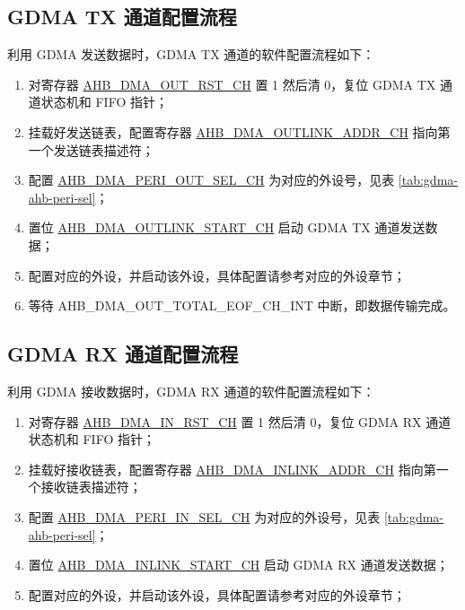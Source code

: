 \documentclass[main\_\_CN.tex]{subfiles}
\begin{document}
\subsection{GDMA TX 通道配置流程}
利用 GDMA 发送数据时，GDMA TX 通道的软件配置流程如下：
\begin{enumerate}
    \item 对寄存器 \hyperref[fielddesc:AHBDMAOUTRSTCHN]{AHB\_DMA\_OUT\_RST\_CH} 置 1 然后清 0，复位 GDMA TX 通道状态机和 FIFO 指针；
    \item 挂载好发送链表，配置寄存器 \hyperref[fielddesc:AHBDMAOUTLINKADDRCHN]{AHB\_DMA\_OUTLINK\_ADDR\_CH} 指向第一个发送链表描述符；
    \item 配置 \hyperref[fielddesc:AHBDMAPERIOUTSELCHN]{AHB\_DMA\_PERI\_OUT\_SEL\_CH} 为对应的外设号，见表 \ref{tab:gdma-ahb-peri-sel}；
    \item 置位 \hyperref[fielddesc:AHBDMAOUTLINKSTARTCHN]{AHB\_DMA\_OUTLINK\_START\_CH} 启动 GDMA TX 通道发送数据；
    \item 配置对应的外设，并启动该外设，具体配置请参考对应的外设章节；
    \item 等待 AHB\_DMA\_OUT\_TOTAL\_EOF\_CH\_INT 中断，即数据传输完成。
\end{enumerate}

\subsection{GDMA RX 通道配置流程}
利用 GDMA 接收数据时，GDMA RX 通道的软件配置流程如下：
\begin{enumerate}
    \item 对寄存器 \hyperref[fielddesc:AHBDMAINRSTCHN]{AHB\_DMA\_IN\_RST\_CH} 置 1 然后清 0，复位 GDMA RX 通道状态机和 FIFO 指针；
    \item 挂载好接收链表，配置寄存器 \hyperref[fielddesc:AHBDMAINLINKADDRCHN]{AHB\_DMA\_INLINK\_ADDR\_CH} 指向第一个接收链表描述符；
    \item 配置 \hyperref[fielddesc:AHBDMAPERIINSELCHN]{AHB\_DMA\_PERI\_IN\_SEL\_CH} 为对应的外设号，见表 \ref{tab:gdma-ahb-peri-sel}；
    \item 置位 \hyperref[fielddesc:AHBDMAINLINKSTARTCHN]{AHB\_DMA\_INLINK\_START\_CH} 启动 GDMA RX 通道发送数据；
    \item 配置对应的外设，并启动该外设，具体配置请参考对应的外设章节；
\end{enumerate}
\end{document}

